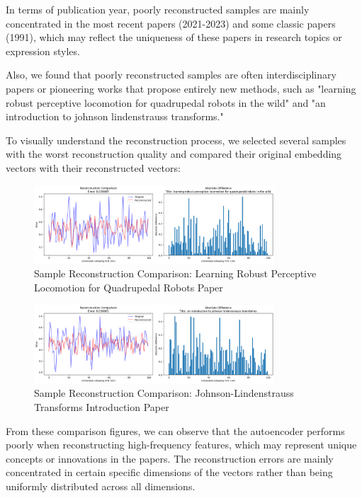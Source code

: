 \documentclass{article}
\begin{document}
In terms of publication year, poorly reconstructed samples are mainly concentrated in the most recent papers (2021-2023) and some classic papers (1991), which may reflect the uniqueness of these papers in research topics or expression styles.
    
Also, we found that poorly reconstructed samples are often interdisciplinary papers or pioneering works that propose entirely new methods, such as "learning robust perceptive locomotion for quadrupedal robots in the wild" and "an introduction to johnson lindenstrauss transforms."

\newpage
To visually understand the reconstruction process, we selected several samples with the worst reconstruction quality and compared their original embedding vectors with their reconstructed vectors:

\begin{figure}[h!]
\centering
\includegraphics[width=0.8\textwidth]{figs/WorstReconstruction1.png}
\caption{Sample Reconstruction Comparison: Learning Robust Perceptive Locomotion for Quadrupedal Robots Paper}
\end{figure}

\begin{figure}[h!]
\centering
\includegraphics[width=0.8\textwidth]{figs/worstReonstruction2.png}
\caption{Sample Reconstruction Comparison: Johnson-Lindenstrauss Transforms Introduction Paper}
\end{figure}

From these comparison figures, we can observe that the autoencoder performs poorly when reconstructing high-frequency features, which may represent unique concepts or innovations in the papers. The reconstruction errors are mainly concentrated in certain specific dimensions of the vectors rather than being uniformly distributed across all dimensions.
\end{document}
